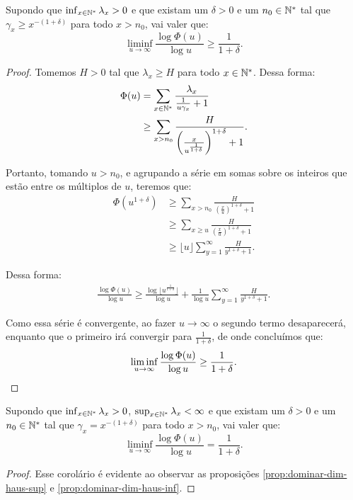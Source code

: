 \begin{proposicao}
\label{prop:dominar-dim-haus-inf}
  Supondo que $\inf_{x\in{\mathbb{N^*}}}\lambda_x  > 0$ e que existam um
  $\delta>0$ e um $n_0 \in {\mathbb{N^*}}$ tal que $\gamma_x \geq x^{-(1+\delta)}$
  para todo $x > n_0$, vai valer que:
  \begin{equation}
    \liminf_{u \to \infty} \frac{\log \Phi(u)}{\log u}  \geq
    \frac{1}{1+\delta} .
  \end{equation}
\end{proposicao}

\begin{proof}
  Tomemos $H > 0$ tal que $\lambda_x \geq H$ para todo $x \in {\mathbb{N^*}}$. Dessa
  forma:
  \begin{align*}
    \Phi(u) &= \sum_{x \in {\mathbb{N^*}}} \frac{\lambda_x}{\frac{1}{u\gamma_x} +
      1}\\
    &\geq \sum_{x > n_0}
    \frac{H}{\left(\frac{x}{u^{\frac{1}{1+\delta}}}\right)^{1+\delta} +1}.
  \end{align*}

  Portanto, tomando $u > n_0$, e agrupando a série em somas sobre os inteiros
  que estão entre os múltiplos de $u$, teremos que:
  \begin{align*}
    \Phi(u^{1+\delta}) 
    &\geq \sum_{x > n_0}
    \frac{H}{\left(\frac{x}{u}\right)^{1+\delta} +1}\\
    &\geq \sum_{x \geq u}
    \frac{H}{\left(\frac{x}{u}\right)^{1+\delta} +1}\\
    &\geq \lfloor u \rfloor \sum_{y = 1}^{\infty}
    \frac{H}{y^{1+\delta} + 1}.
  \end{align*}

  Dessa forma:
  \begin{align*}
    \frac{\log \Phi(u)}{\log u} \geq \frac{\log\lfloor
      u^{\frac{1}{1+\delta}} \rfloor }{\log u} + 
    \frac{1}{\log u} \sum_{y = 1}^{\infty}
    \frac{H}{y^{1+\delta} + 1}.
  \end{align*}

  Como essa série é convergente, ao fazer $u \to \infty$ o segundo
  termo desaparecerá, enquanto que o primeiro irá convergir para
  $\frac{1}{1+\delta}$, de onde concluímos que:
  \begin{displaymath}
    \liminf_{u \to \infty} \frac{\log \Phi (u)}{\log u} \geq
    \frac{1}{1+\delta} .
    \qedhere
  \end{displaymath}
\end{proof}

\begin{corolario}
  \label{prop:igualar-dim-haus}
  Supondo que $\inf_{x \in {\mathbb{N^*}}} \lambda_x > 0$, $\sup_{x \in {\mathbb{N^*}}}
  \lambda_x < \infty$ e que existam um $\delta > 0$ e um $n_0 \in {\mathbb{N^*}}$
  tal que $\gamma_x = x^{-(1+\delta)}$ para todo $x > n_0$, vai valer que:
  \begin{displaymath}
    \liminf_{u \to \infty} \frac{\log \Phi(u)}{\log u} =
    \frac{1}{1+\delta} .
  \end{displaymath}
\end{corolario}
\begin{proof}
  Esse corolário é evidente ao observar as proposições
  \ref{prop:dominar-dim-haus-sup} e \ref{prop:dominar-dim-haus-inf}.
\end{proof}


